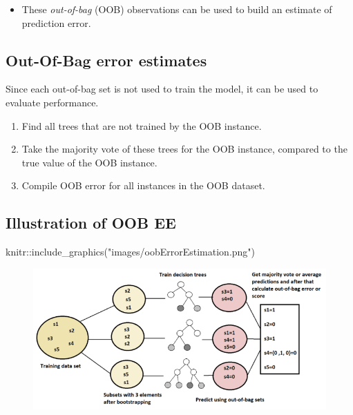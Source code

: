\documentclass[
  letterpaper,
  DIV=11,
  numbers=noendperiod]{scrartcl}
\newenvironment{Shaded}{\begin{snugshade}}{\end{snugshade}}
\newcommand{\FunctionTok}[1]{\textcolor[rgb]{0.28,0.35,0.67}{#1}}
\newcommand{\NormalTok}[1]{\textcolor[rgb]{0.00,0.23,0.31}{#1}}
\newcommand{\SpecialCharTok}[1]{\textcolor[rgb]{0.37,0.37,0.37}{#1}}
\newcommand{\StringTok}[1]{\textcolor[rgb]{0.13,0.47,0.30}{#1}}
\providecommand{\tightlist}{%
  \setlength{\itemsep}{0pt}\setlength{\parskip}{0pt}}\usepackage{longtable,booktabs,array}
\begin{document}
\begin{itemize}
\tightlist
\item
  These \emph{out-of-bag} (OOB) observations can be used to build an
  estimate of prediction error.
\end{itemize}

\hypertarget{out-of-bag-error-estimates}{%
\subsection{Out-Of-Bag error
estimates}\label{out-of-bag-error-estimates}}

Since each out-of-bag set is not used to train the model, it can be used
to evaluate performance.

\begin{enumerate}
\def\labelenumi{\arabic{enumi}.}
\tightlist
\item
  Find all trees that are not trained by the OOB instance.
\item
  Take the majority vote of these trees for the OOB instance, compared
  to the true value of the OOB instance.
\item
  Compile OOB error for all instances in the OOB dataset.
\end{enumerate}

\hypertarget{illustration-of-oob-ee}{%
\subsection{Illustration of OOB EE}\label{illustration-of-oob-ee}}

\begin{Shaded}
\begin{Highlighting}[]
\NormalTok{knitr}\SpecialCharTok{::}\FunctionTok{include\_graphics}\NormalTok{(}\StringTok{"images/oobErrorEstimation.png"}\NormalTok{)}
\end{Highlighting}
\end{Shaded}

\begin{figure}[H]

{\centering \includegraphics[width=1\textwidth,height=\textheight]{images/oobErrorEstimation.png}

}

\end{figure}
\end{document}
